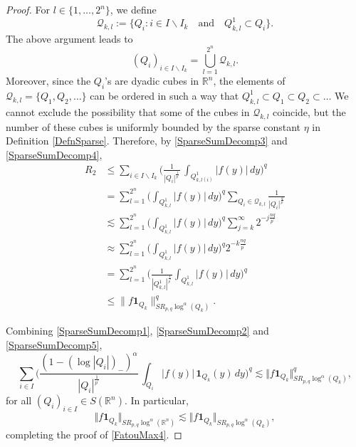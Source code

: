 \documentclass[11pt, a4paper,leqno]{amsart}
\theoremstyle{plain}
\numberwithin{equation}{section}
\theoremstyle{definition}
\theoremstyle{remark}
\begin{document}
\begin{proof}
For $l \in\{1, \ldots, 2^{n}\}$, we define
\[
\mathcal{Q}_{k, l} := \{Q_{i} : i \in I \backslash I_{k} \quad\text{and} \quad
Q^{1}_{k, l} \subset Q_{i}\}.
\]
The above argument leads to
\begin{equation}
\label{SparseSumDecomp4}(Q_{i})_{i \in I \backslash I_{k}} = \bigcup
_{l=1}^{2^{n}} \mathcal{Q}_{k, l}.
\end{equation}
Moreover, since the $Q_{i}$'s are dyadic cubes in $\mathbb{R}^{n}$, the
elements of $\mathcal{Q}_{k, l} = \{Q_{1}, Q_{2}, \ldots\}$ can be ordered in
such a way that
$
Q^{1}_{k, l} \subset Q_{1} \subset Q_{2} \subset\ldots
$
We cannot exclude the possibility that some of the cubes in $\mathcal{Q}_{k,
l}$ coincide, but the number of these cubes is uniformly bounded by the sparse
constant $\eta$ in Definition \ref{DefnSparse}. Therefore, by
\eqref{SparseSumDecomp3} and \eqref{SparseSumDecomp4},
\begin{align}
R_{2}  &  \leq\sum_{i \in I \backslash I_{k}} \bigg( \frac{1}{|Q_{i}%
|^{\frac{1}{p^{\prime}}}} \, \int_{Q^{1}_{k, l(i)}} |f(y)| \, dy
\bigg)^{q}\nonumber\\
&  = \sum_{l=1}^{2^{n}} \bigg(\int_{Q^{1}_{k, l}} |f(y)| \, dy \bigg)^{q}
\sum_{Q_{i} \in\mathcal{Q}_{k, l}} \frac{1}{|Q_{i}|^{\frac{q}{p^{\prime}}}%
}\nonumber\\
&  \lesssim\sum_{l=1}^{2^{n}} \bigg(\int_{Q^{1}_{k, l}} |f(y)| \, dy \bigg)^{q}
\sum_{j=k}^{\infty}2^{-j \frac{n q}{p^{\prime}}}\nonumber\\
&  \approx\sum_{l=1}^{2^{n}} \bigg(\int_{Q^{1}_{k, l}} |f(y)| \, dy \bigg)^{q}
2^{-k \frac{n q}{p^{\prime}}}\nonumber\\
&  = \sum_{l=1}^{2^{n}} \bigg(\frac{1}{|Q^{1}_{k, l}|^{\frac{1}{p^{\prime}}}}
\int_{Q^{1}_{k, l}} |f(y)| \, dy \bigg)^{q}\nonumber\\
&  \leq\|f \mathbf{1}_{Q_{k}}\|^{q}_{SR_{p, q} \log^{\alpha}(Q_{k})}.
\label{SparseSumDecomp5}%
\end{align}


Combining \eqref{SparseSumDecomp1}, \eqref{SparseSumDecomp2} and
\eqref{SparseSumDecomp5},
\[
\sum_{i\in I}\bigg(\frac{(1-(\log|Q_{i}|)_{-})^{\alpha}}{|Q_{i}|^{\frac
{1}{p^{\prime}}}}\,\int_{Q_{i}}|f(y)|\,\mathbf{1}_{Q_{k}}(y)\,dy\bigg)^{q}%
\lesssim\Vert f\mathbf{1}_{Q_{k}}\Vert_{SR_{p,q}\log^{\alpha}(Q_{k})}^{q},
\]
for all $(Q_{i})_{i\in I}\in S(\mathbb{R}^{n})$. In particular,
\[
\Vert f\mathbf{1}_{Q_{k}}\Vert_{SR_{p,q}\log^{\alpha}(\mathbb{R}^{n})}%
\lesssim\Vert f\mathbf{1}_{Q_{k}}\Vert_{SR_{p,q}\log^{\alpha}(Q_{k})},
\]
completing the proof of \eqref{FatouMax4}.


\end{proof}
\end{document}
